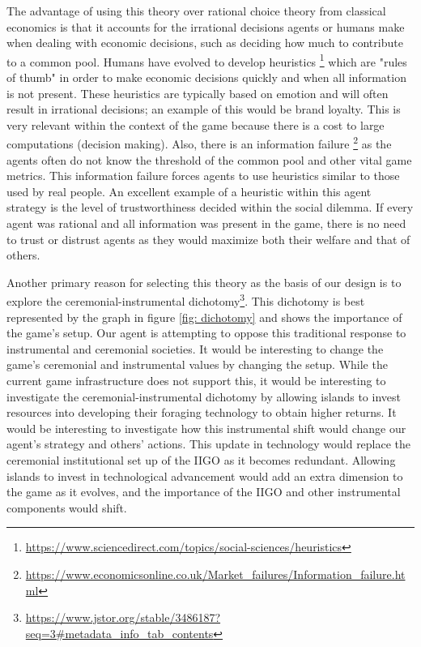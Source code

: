 The advantage of using this theory over rational choice theory from classical economics is that it accounts for the irrational decisions agents or humans make when dealing with economic decisions, such as deciding how much to contribute to a common pool. Humans have evolved to develop heuristics \footnote{\url{https://www.sciencedirect.com/topics/social-sciences/heuristics}} which are "rules of thumb" in order to make economic decisions quickly and when all information is not present. These heuristics are typically based on emotion and will often result in irrational decisions; an example of this would be brand loyalty. This is very relevant within the context of the game because there is a cost to large computations (decision making). Also, there is an information failure \footnote{\url{https://www.economicsonline.co.uk/Market_failures/Information_failure.html}} as the agents often do not know the threshold of the common pool and other vital game metrics. This information failure forces agents to use heuristics similar to those used by real people. An excellent example of a heuristic within this agent strategy is the level of trustworthiness decided within the social dilemma. If every agent was rational and all information was present in the game, there is no need to trust or distrust agents as they would maximize both their welfare and that of others.

Another primary reason for selecting this theory as the basis of our design is to explore the ceremonial-instrumental dichotomy\footnote{\url{https://www.jstor.org/stable/3486187?seq=3\#metadata_info_tab_contents}}. This dichotomy is best represented by the graph in figure \ref{fig: dichotomy} and shows the importance of the game's setup. Our agent is attempting to oppose this traditional response to instrumental and ceremonial societies. It would be interesting to change the game's ceremonial and instrumental values by changing the setup. While the current game infrastructure does not support this, it would be interesting to investigate the ceremonial-instrumental dichotomy by allowing islands to invest resources into developing their foraging technology to obtain higher returns. It would be interesting to investigate how this instrumental shift would change our agent's strategy and others' actions. This update in technology would replace the ceremonial institutional set up of the IIGO as it becomes redundant. Allowing islands to invest in technological advancement would add an extra dimension to the game as it evolves, and the importance of the IIGO and other instrumental components would shift.

